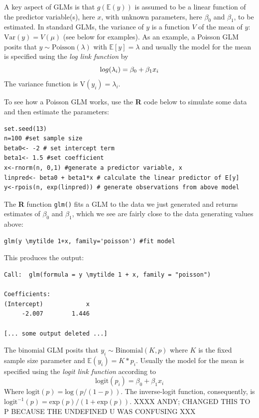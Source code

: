 A key aspect of GLMs is that 
$g(\mathbb{E}(y))$ is assumed to be a linear function of the
predictor variable(s), here $x$, with unknown parameters, here $\beta_0$ and $\beta_1$, to be
estimated. In standard GLMs,
the variance of $y$ is a function $V$ of the mean of $y$: $\mbox{Var}(y) =
V(\mu)$ (see below for examples).
As an example, a Poisson GLM posits that $y \sim \mbox{Poisson}(\lambda)$ with $\mathbb{E}[y]
=\lambda$ and usually the model for the mean is specified using the
{\it log link function} by
\[
{\text log}(\lambda_{i}) = \beta_0 + \beta_{1}  x_{i}
\]
The variance function is $\mbox{V}(y_{i}) = \lambda_{i}$.  

To see how a Poisson GLM works, use the {\bf R} code below to simulate
some data and then estimate the parameters:
\begin{verbatim}
set.seed(13)
n=100 #set sample size
beta0<- -2 # set intercept term
beta1<- 1.5 #set coefficient
x<-rnorm(n, 0,1) #generate a predictor variable, x
linpred<- beta0 + beta1*x # calculate the linear predictor of E[y]
y<-rpois(n, exp(linpred)) # generate observations from above model
\end{verbatim} 
The {\bf R} function {\tt glm()} fits a GLM to the data we just
generated and returns estimates of $\beta_0$ and $\beta_1$, which we
see are fairly close to the data generating values above:
\begin{Verbatim}[commandchars=\\\{\}] 
glm(y \mytilde 1+x, family='poisson') #fit model
\end{Verbatim}
This produces the output:
\begin{Verbatim}[commandchars=\\\{\}] 
Call:  glm(formula = y \mytilde 1 + x, family = "poisson")

Coefficients:
(Intercept)            x  
     -2.007        1.446  

[... some output deleted ...]
\end{Verbatim}

The
binomial GLM posits that $y_{i} \sim \mbox{Binomial}(K,p)$ where $K$
is the fixed sample size parameter and $\mathbb{E}(y_{i}) = K*p_{i}$. Usually
the model for the mean is specified using the {\it logit link
  function} according to
\[
 \text {logit}(p_{i}) = \beta_{0} + \beta_{1}  x_{i}
\]
Where $\text {logit}(p) = \text {log}(p/(1-p))$.  The inverse-logit function,
consequently, is $\text {logit}^{-1}(p) =
\text {exp}(p)/(1+\text {exp}(p))$.
XXXX ANDY; CHANGED THIS TO P BECAUSE THE UNDEFINED U WAS CONFUSING XXX

